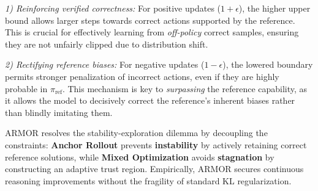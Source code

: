 \textit{1) Reinforcing verified correctness:} For positive updates ($1+\epsilon$), the higher upper bound allows larger steps towards correct actions supported by the reference. 
This is crucial for effectively learning from \emph{off-policy} correct samples, ensuring they are not unfairly clipped due to distribution shift.

\textit{2) Rectifying reference biases:} For negative updates ($1-\epsilon$), the lowered boundary permits stronger penalization of incorrect actions, even if they are highly probable in $\pi_{\text{ref}}$. 
This mechanism is key to \emph{surpassing} the reference capability, as it allows the model to decisively correct the reference's inherent biases rather than blindly imitating them.



\begin{paperbox}
ARMOR resolves the stability-exploration dilemma by decoupling the constraints: 
\textbf{Anchor Rollout} prevents \textbf{instability} by actively retaining correct reference solutions, while \textbf{Mixed Optimization} avoids \textbf{stagnation} by constructing an adaptive trust region. 
Empirically, ARMOR secures continuous reasoning improvements without the fragility of standard KL regularization.
\end{paperbox}

